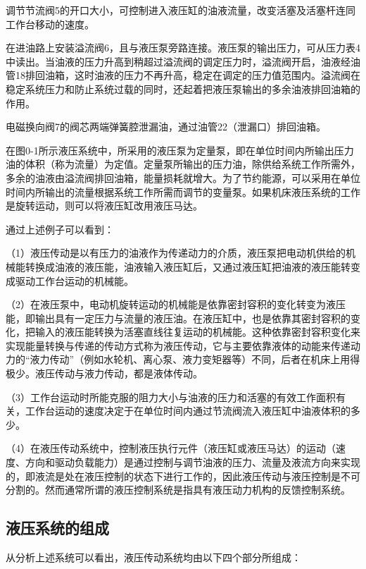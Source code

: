     调节节流阀5的开口大小，可控制进入液压缸的油液流量，改变活塞及活塞杆连同工作台移动的速度。

    在进油路上安装溢流阀6，且与液压泵旁路连接。液压泵的输出压力，可从压力表4中读出。当油液的压力升高到稍超过溢流阀的调定压力时，溢流阀开启，油液经油管18排回油箱，这时油液的压力不再升高，稳定在调定的压力值范围内。溢流阀在稳定系统压力和防止系统过载的同时，还起着把液压泵输出的多余油液排回油箱的作用。

    电磁换向阀7的阀芯两端弹簧腔泄漏油，通过油管22（泄漏口）排回油箱。



    在图0-1所示液压系统中，所采用的液压泵为定量泵，即在单位时间内所输出压力油的体积（称为流量）为定值。定量泵所输出的压力油，除供给系统工作所需外，多余的油液由溢流阀排回油箱，能量损耗就增大。为了节约能源，可以采用在单位时间内所输出的流量根据系统工作所需而调节的变量泵。如果机床液压系统的工作是旋转运动，则可以将液压缸改用液压马达。

    通过上述例子可以看到：

    （1）液压传动是以有压力的油液作为传递动力的介质，液压泵把电动机供给的机械能转换成油液的液压能，油液输入液压缸后，又通过液压缸把油液的液压能转变成驱动工作台运动的机械能。

    （2）在液压泵中，电动机旋转运动的机械能是依靠密封容积的变化转变为液压能，即输出具有一定压力与流量的液压油。在液压缸中，也是依靠其密封容积的变化，把输入的液压能转换为活塞直线往复运动的机械能。这种依靠密封容积变化来实现能量转换与传递的传动方式称为液压传动，它与主要依靠液体的动能来传递动力的“液力传动”（例如水轮机、离心泵、液力变矩器等）不同，后者在机床上用得极少。液压传动与液力传动，都是液体传动。

    （3）工作台运动时所能克服的阻力大小与油液的压力和活塞的有效工作面积有关，工作台运动的速度决定于在单位时间内通过节流阀流入液压缸中油液体积的多少。

    （4）在液压传动系统中，控制液压执行元件（液压缸或液压马达）的运动（速度、方向和驱动负载能力）是通过控制与调节油液的压力、流量及液流方向来实现的，即液流是处在液压控制的状态下进行工作的，因此液压传动与液压控制是不可分割的。然而通常所谓的液压控制系统是指具有液压动力机构的反馈控制系统。


\subsection{液压系统的组成}

    从分析上述系统可以看出，液压传动系统均由以下四个部分所组成：

